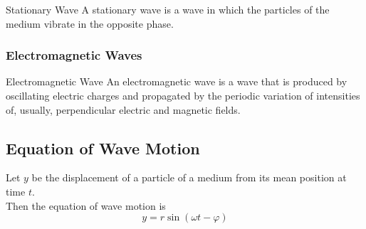 \documentclass[12pt]{article}
\numberwithin{equation}{subsection}
\begin{document}
\begin{definition}{Stationary Wave}{}
    A stationary wave is a wave in which the particles of the medium vibrate in the opposite phase.
\end{definition}

\subsubsection{Electromagnetic Waves}

\begin{definition}{Electromagnetic Wave}{}
    An electromagnetic wave is a wave that is produced by oscillating electric charges and propagated by the periodic variation of intensities of, usually, perpendicular electric and magnetic fields.
\end{definition}

\subsection{Equation of Wave Motion}
Let $y$ be the displacement of a particle of a medium from its mean position at time $t$. \\

Then the equation of wave motion is
\begin{equation}
    \boxed{ y = r \sin{(\omega t - \varphi)} }
\end{equation}
\end{document}
